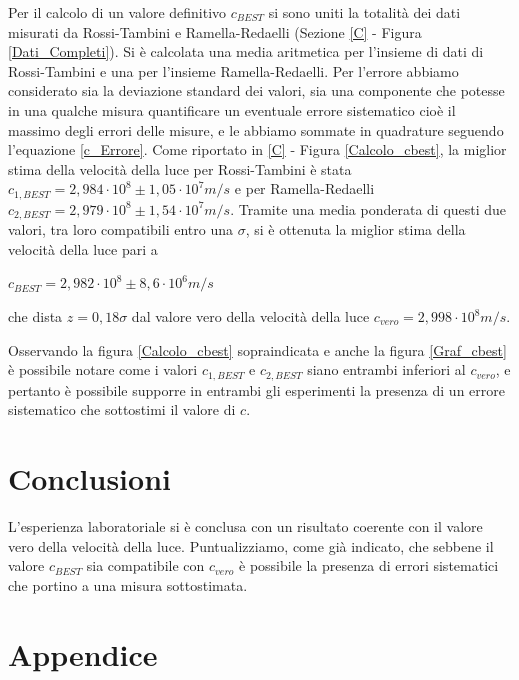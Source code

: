 \documentclass{article}
\begin{document}
Per il calcolo di un valore definitivo $c_{BEST}$ si sono uniti la totalità dei dati misurati da Rossi-Tambini e Ramella-Redaelli (Sezione \ref{C} - Figura 
\ref{Dati_Completi}). Si è calcolata una media aritmetica per l'insieme di dati di Rossi-Tambini e una per l'insieme Ramella-Redaelli.
Per l'errore abbiamo considerato sia la deviazione standard dei valori, sia una componente che potesse in una qualche misura quantificare un eventuale errore sistematico cioè il massimo degli errori delle misure, e le abbiamo sommate in 
quadrature seguendo l'equazione \ref{c_Errore}.
Come riportato in \ref{C} - Figura \ref{Calcolo_cbest}, la miglior stima della velocità della luce per Rossi-Tambini è stata $c_{1,BEST}=2,984\cdot10^8 \pm 1,05\cdot10^7 m/s$
e per Ramella-Redaelli $c_{2,BEST}=2,979\cdot10^8\pm 1,54\cdot10^7 m/s$.
Tramite una media ponderata di questi due valori, tra loro compatibili entro una $\sigma$, si è ottenuta la miglior stima della velocità della luce pari a

\begin{center}
    $c_{BEST} = 2,982\cdot10^8 \pm 8,6 \cdot 10^6 m/s$
\end{center}
che dista $z=0,18\sigma$ dal valore vero della velocità della luce $c_{vero}=2,998\cdot10^8 m/s$.

Osservando la figura \ref{Calcolo_cbest} sopraindicata e anche la figura \ref{Graf_cbest} è possibile notare come i valori $c_{1,BEST}$ e $c_{2,BEST}$ siano entrambi
inferiori al $c_{vero}$, e pertanto è possibile supporre in entrambi gli esperimenti la presenza di un errore sistematico che sottostimi il valore di $c$.

\section{Conclusioni}

L'esperienza laboratoriale si è conclusa con un risultato coerente con il valore vero della velocità della luce. Puntualizziamo, come già indicato, che sebbene il valore
$c_{BEST}$ sia compatibile con $c_{vero}$ è possibile la presenza di errori sistematici che portino a una misura sottostimata.

\newpage

\section{Appendice}

\end{document}
